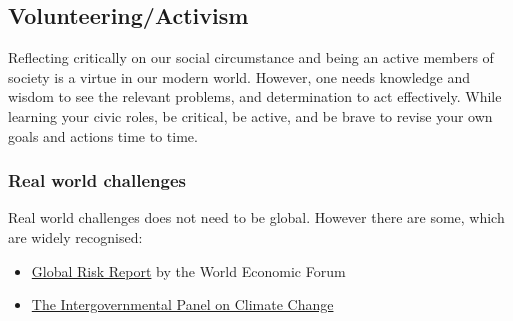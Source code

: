 \documentclass{article}
\begin{document}
\subsection{Volunteering/Activism}

Reflecting critically on our social circumstance and being an active members of society is a virtue in our modern world.
However, one needs knowledge and wisdom to see the relevant problems, and determination to act effectively.
While learning your civic roles,
be critical, be active, and be brave to revise your own goals and actions time to time.




\subsubsection{Real world challenges}
Real world challenges does not need to be global. However there are some, which are widely recognised:
\begin{itemize}
    \item \href{https://reports.weforum.org/global-risks-report-2020/}{Global Risk Report} by the World Economic Forum
    \item \href{https://www.ipcc.ch/}{The Intergovernmental Panel on Climate Change}
\end{itemize}
\end{document}
